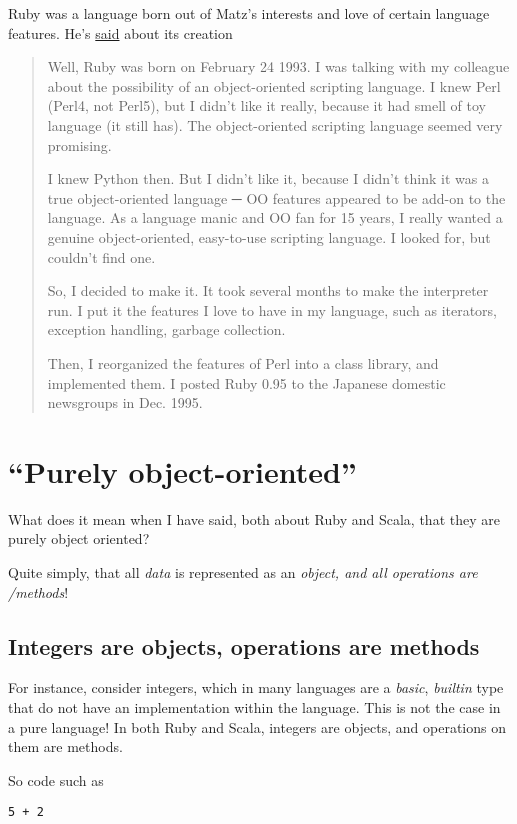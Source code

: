 \documentclass[11pt]{article}
\begin{document}
Ruby was a language born out of Matz's interests
and love of certain language features.
He's \href{https://ruby-doc.org/docs/ruby-doc-bundle/FAQ/FAQ.html}{said}
about its creation
\begin{quote}
Well, Ruby was born on February 24 1993.
I was talking with my colleague about the possibility of
an object-oriented scripting language.
I knew Perl (Perl4, not Perl5), but I didn't like it really,
because it had smell of toy language (it still has).
The object-oriented scripting language seemed very promising.

I knew Python then. But I didn't like it,
because I didn't think it was a true object-oriented language
─ OO features appeared to be add-on to the language.
As a language manic and OO fan for 15 years,
I really wanted a genuine object-oriented,
easy-to-use scripting language.
I looked for, but couldn't find one.

So, I decided to make it.
It took several months to make the interpreter run.
I put it the features I love to have in my language,
such as iterators, exception handling, garbage collection.

Then, I reorganized the features of Perl into a class library,
and implemented them. I posted Ruby 0.95 to
the Japanese domestic newsgroups in Dec. 1995.
\end{quote}

\section{“Purely object-oriented”}
\label{sec:org7cbd489}
What does it mean when I have said, both about Ruby and Scala,
that they are purely object oriented?

Quite simply, that all \emph{data} is represented as an \emph{object,
and all operations are /methods}!

\subsection{Integers are objects, operations are methods}
\label{sec:orgdcfe76f}
For instance, consider integers, which in many languages are
a \emph{basic}, \emph{builtin} type that do not have an implementation
within the language. This is not the case in a pure language!
In both Ruby and Scala, integers are objects, and operations on them
are methods.

So code such as
\begin{verbatim}
5 + 2
\end{verbatim}
\end{document}
